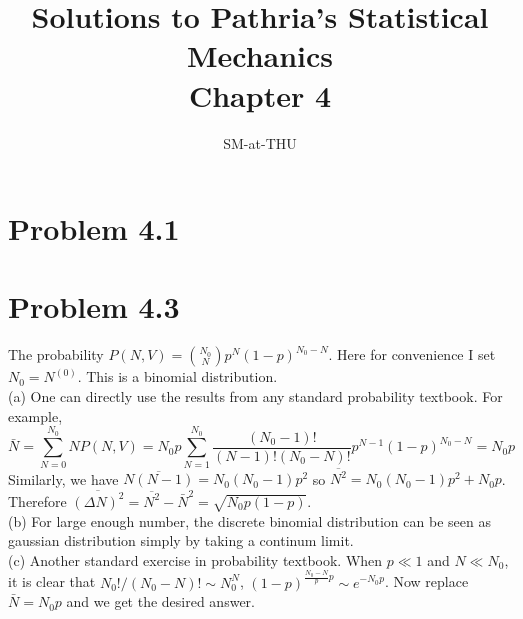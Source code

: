 \documentclass{article}
\author{SM-at-THU}
\title{\bf{Solutions to Pathria's Statistical Mechanics}\\Chapter 4}
\begin{document}
\maketitle
\section*{Problem 4.1}


\section*{Problem 4.3}
The probability $P(N,V) = \binom{N_{0}}{N} p^{N} (1-p)^{N_{0}-N}$. Here for convenience I set $N_{0} = N^{(0)}$. This is a binomial distribution.\\
(a) One can directly use the results from any standard probability textbook. For example,
\begin{equation}
\bar{N} = \sum_{N=0}^{N_{0}} N P(N,V) = N_{0} p \sum_{N=1}^{N_{0}} \frac{(N_{0}-1)!}{(N-1)!(N_{0} - N)!} p^{N-1} (1-p)^{N_{0}-N} = N_{0}p
\end{equation}
Similarly, we have $\overline{N(N-1)} = N_{0}(N_{0}-1) p^{2}$ so $\overline{N^{2}} = N_{0}(N_{0}-1) p^{2} + N_{0}p$. 
Therefore $\overline{(\Delta N)^{2}} = \overline{N^{2}} - \bar{N}^{2} =\sqrt{N_{0}p(1-p)}$.\\
(b) For large enough number, the discrete binomial distribution can be seen as gaussian distribution simply by taking a continum limit.\\
(c) Another standard exercise in probability textbook. When $p \ll 1$ and $N \ll N_{0}$, it is clear that $N_{0}!/(N_{0}-N)! \sim N_{0}^{N}$, $(1-p)^{\frac{N_{0}-N}{p} p} \sim e^{-N_{0}p}$. Now replace $\bar{N} = N_{0}p$ and we get the desired answer.
\end{document}

